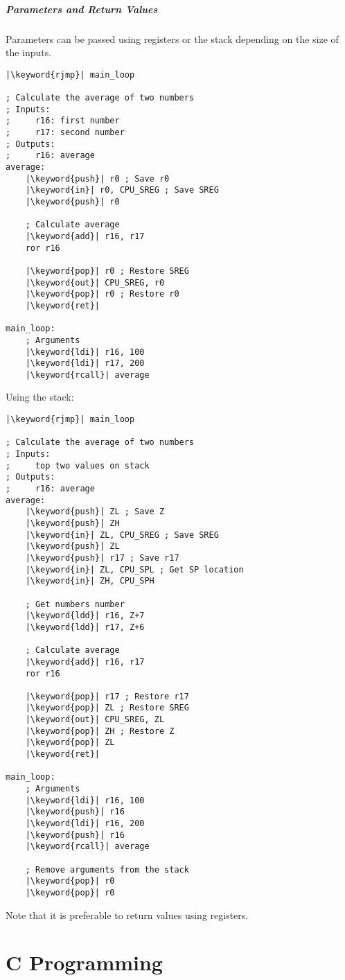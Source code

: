 \documentclass{article}
\newcommand{\keyword}[1]{\textcolor[rgb]{0.00,0.50,0.00}{\textbf{#1}}}
\begin{document}
\subsubsection{Parameters and Return Values}
Parameters can be passed using registers or the stack depending on the
size of the inputs.
\begin{verbatim}
|\keyword{rjmp}| main_loop

; Calculate the average of two numbers
; Inputs:
;     r16: first number
;     r17: second number
; Outputs:
;     r16: average
average:
    |\keyword{push}| r0 ; Save r0
    |\keyword{in}| r0, CPU_SREG ; Save SREG
    |\keyword{push}| r0

    ; Calculate average
    |\keyword{add}| r16, r17
    ror r16

    |\keyword{pop}| r0 ; Restore SREG
    |\keyword{out}| CPU_SREG, r0
    |\keyword{pop}| r0 ; Restore r0
    |\keyword{ret}|

main_loop:
    ; Arguments
    |\keyword{ldi}| r16, 100
    |\keyword{ldi}| r17, 200
    |\keyword{rcall}| average
\end{verbatim}
Using the stack:
\begin{verbatim}
|\keyword{rjmp}| main_loop

; Calculate the average of two numbers
; Inputs:
;     top two values on stack
; Outputs:
;     r16: average
average:
    |\keyword{push}| ZL ; Save Z
    |\keyword{push}| ZH
    |\keyword{in}| ZL, CPU_SREG ; Save SREG
    |\keyword{push}| ZL
    |\keyword{push}| r17 ; Save r17
    |\keyword{in}| ZL, CPU_SPL ; Get SP location
    |\keyword{in}| ZH, CPU_SPH

    ; Get numbers number
    |\keyword{ldd}| r16, Z+7
    |\keyword{ldd}| r17, Z+6

    ; Calculate average
    |\keyword{add}| r16, r17
    ror r16

    |\keyword{pop}| r17 ; Restore r17
    |\keyword{pop}| ZL ; Restore SREG
    |\keyword{out}| CPU_SREG, ZL
    |\keyword{pop}| ZH ; Restore Z
    |\keyword{pop}| ZL
    |\keyword{ret}|

main_loop:
    ; Arguments
    |\keyword{ldi}| r16, 100
    |\keyword{push}| r16
    |\keyword{ldi}| r16, 200
    |\keyword{push}| r16
    |\keyword{rcall}| average

    ; Remove arguments from the stack
    |\keyword{pop}| r0
    |\keyword{pop}| r0
\end{verbatim}
Note that it is preferable to return values using registers.
\part{C Programming}
\end{document}
